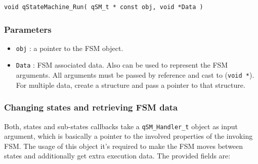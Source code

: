 \documentclass{article}
\begin{document}
\begin{lstlisting}[style=CStyle]
void qStateMachine_Run( qSM_t * const obj, void *Data )
\end{lstlisting}

\subsubsection*{Parameters}
\begin{itemize}
    \item \lstinline{obj} : a pointer to the FSM object.
    \item \lstinline{Data} : FSM associated data. Also can be used to represent the FSM arguments. All arguments must be passed by reference and cast to (\lstinline{void *}). For multiple data, create a structure and pass a pointer to that structure.  
\end{itemize}  

\subsubsection{Changing states and retrieving FSM data}
Both, states and sub-states callbacks take a \lstinline{qSM_Handler_t}  object as input argument, which is basically a pointer to the involved properties of the invoking FSM. The usage of this object it's required to make the FSM moves between states and additionally get extra execution data. The provided fields are:
\end{document}
